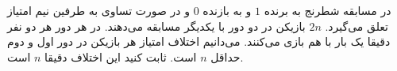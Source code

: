 \EXERCISE
در مسابقه شطرنج به برنده
$1$
و به بازنده
$0$
و در صورت تساوی به طرفین نیم امتیاز تعلق می‌گیرد.
$2n$
بازیکن در دو دور با یکدیگر مسابقه می‌دهند. در هر دور هر دو نفر دقیقا یک بار با هم بازی می‌کنند. می‌دانیم اختلاف امتیاز هر بازیکن در دور اول و دوم حداقل
$n$
است. ثابت کنید این اختلاف دقیقا
$n$
است.